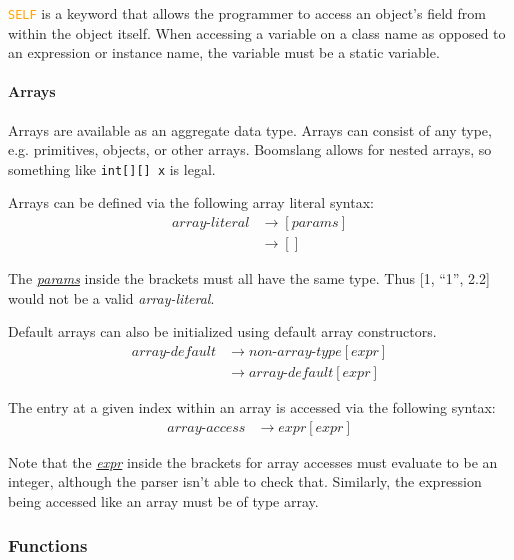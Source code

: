 \documentclass{article}
\begin{document}
\textcolor{orange}{\texttt{SELF}} is a keyword that allows the programmer to access an object's field from within the object itself. When accessing a variable on a class name as opposed to an expression or instance name, the variable must be a static variable.

\paragraph{Arrays}
Arrays are available as an aggregate data type. Arrays can consist of any type, e.g. primitives, objects, or other arrays. Boomslang allows for nested arrays, so something like \texttt{int[][] x} is legal.

Arrays can be defined via the following array literal syntax:
\label{sec:array-literal}
\begin{align*}
    \textit{array-literal} &\to [\hyperref[sec:params]{\textit{params}}] \\
    &\to []
\end{align*}

The \hyperref[sec:params]{\textit{params}} inside the brackets must all have the same type. Thus [1, ``1'', 2.2] would not be a valid \textit{array-literal}.

Default arrays can also be initialized using default array constructors.
\label{sec:array-default}
\begin{align*}
    \textit{array-default} &\to \hyperref[sec:type]{\textit{non-array-type}}[\hyperref[sec:expr]{\textit{expr}}] \\
    &\to \hyperref[sec:array-default]{\textit{array-default}}[\hyperref[sec:expr]{\textit{expr}}]
\end{align*}

The entry at a given index within an array is accessed via the following syntax:
\label{sec:array-access}
\begin{align*}
    \textit{array-access} &\to \hyperref[sec:expr]{\textit{expr}}[\hyperref[sec:expr]{\textit{expr}}]
\end{align*}

Note that the \hyperref[sec:expr]{\textit{expr}} inside the brackets for array accesses must evaluate to be an integer, although the parser isn't able to check that. Similarly, the expression being accessed like an array must be of type array.

\subsubsection{Functions}
\end{document}
